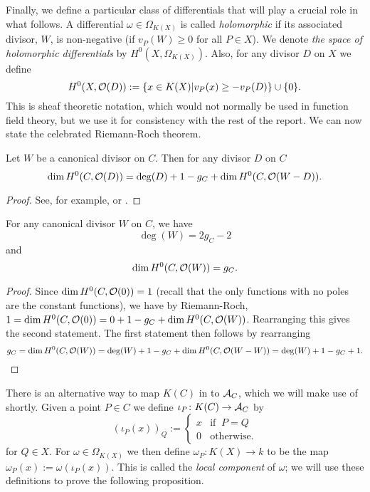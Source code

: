 Finally, we define a particular class of differentials that will play a crucial role in what follows.
A differential $\omega \in \Omega_{K(X)}$ is called {\em holomorphic} if its associated divisor, $W$, is non-negative (\ie if $v_P(W) \geq 0$ for all $P\in X$).
We denote {\em the space of holomorphic differentials} by $H^0(X,\Omega_{K(X)})$.
Also, for any divisor $D$ on $X$ we define 
\[
H^0(X,{\cal O}(D)) := \{x\in K(X) | v_P(x) \geq -v_P(D)\}\cup \{0\}.
\]
This is sheaf theoretic notation, which would not normally be used in function field theory, but we use it for consistency with the rest of the report.
We can now state the celebrated Riemann-Roch theorem.

\begin{thm}\label{riemannroch}
Let $W$ be a canonical divisor on $C$.
Then for any divisor $D$ on $C$ 
\[
 \dim H^0(C,{\cal O}(D)) = \deg(D) + 1 - g_C + \dim H^0(C,{\cal O}(W-D)).
\]
\end{thm}
\begin{proof}
 See, for example, \cite[8.6]{fulton} or \cite[I.5.15]{stichtenoth}.
\end{proof}


\begin{cor}\label{dim=gc}
 For any canonical divisor $W$ on $C$, we have 
 \[
  \deg(W) = 2g_C-2
 \]
and \[
     \dim H^0(C,{\cal O}(W)) = g_C.
    \]
\end{cor}
\begin{proof}
Since $\dim H^0(C,{\cal O}(0)) = 1$ (recall that the only functions with no poles are the constant functions), we have by Riemann-Roch, $ 1= \dim H^0(C,{\cal O}(0)) = 0 + 1 -g_C + \dim H^0(C,{\cal O}(W))$.
 Rearranging this gives the second statement.
 The first statement then follows by rearranging
\[
 g_C = \dim H^0(C,{\cal O}(W)) = \deg(W) + 1 -g_C +  \dim H^0(C,{\cal O}(W-W))= \deg(W) + 1 -g_C + 1.
\]
\end{proof}


There is an alternative way to map $K(C)$ in to ${\mathcal A}_C$, which we will make use of shortly.
Given a point $P\in C$ we define $\iota_P\colon K(C) \rightarrow {\mathcal A}_C$ by
\begin{equation}
 (\iota_P(x))_Q:= \begin{cases}
           x & \text{if }\ P=Q\\
           0 & \text{otherwise}.
           \end{cases}
\end{equation}
for $Q\in X$.
For $\omega \in \Omega_{K(X)}$ we then define $\omega_P\colon K(X) \rightarrow k$ to be the map $\omega_P(x) := \omega(\iota_P(x))$.
This is called the {\em local component} of $\omega$; we will use these definitions to prove the following proposition.

